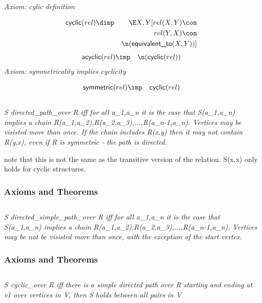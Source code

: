 \emph{Axiom: cylic definition}

\begin{eqnarray*}
 \pr{cyclic}(rel) &\dimp & \E X, Y[rel(X, Y) \con \\
&&rel(Y, X) \con \\
&& \n( \pr{equivalent\_to}(X, Y) )]
\end{eqnarray*}
\begin{eqnarray*}
 \pr{acyclic}(rel) &\imp & \n( \pr{cyclic}(rel) )
\end{eqnarray*}
\emph{Axiom: symmetricality implies cyclicity}

\begin{eqnarray*}
 \pr{symmetric}(rel) &\imp & \pr{cyclic}(rel) 
\end{eqnarray*}

\subsection{ }
\emph{S directed\_path\_over R iff for all a\_1,a\_n it is the case that S(a\_1,a\_n) implies a chain R(a\_1,a\_2),R(a\_2,a\_3),...,R(a\_{n-1},a\_n). Vertices may be visisted more than once. If the chain includes R(x,y) then it may not contain R(y,x), even if R is symmetric - the path is directed.}

note that this is not the same as the transitive version of the relation. S(x,x) only holds for cyclic structures.

\subsubsection{Axioms and Theorems}



\subsection{ }
\emph{S directed\_simple\_path\_over R iff for all a\_1,a\_n it is the case that S(a\_1,a\_n) implies a chain R(a\_1,a\_2),R(a\_2,a\_3),...,R(a\_{n-1},a\_n). Vertices may be not be visisted more than once, with the exception of the start vertex.}

\subsubsection{Axioms and Theorems}



\subsection{ }
\emph{S cyclic\_over R iff there is a simple directed path over R starting and ending at v1 over vertices in V, then S holds between all pairs in V}

